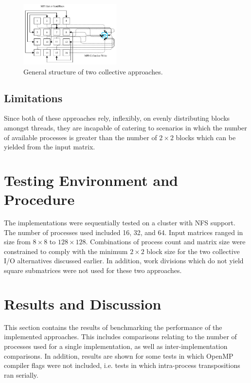 \documentclass[journal,10pt,a4paper]{IEEEtran}
\begin{document}
\begin{figure}[H]
    \centering
    \includegraphics[width=0.45\textwidth]{col.pdf}
    \caption{General structure of two collective approaches.}
    \label{fig:my_label}
\end{figure}



\subsection{Limitations}
Since both of these approaches rely, inflexibly, on evenly distributing blocks amongst threads, they are incapable of catering to scenarios in which the number of available processes is greater than the number of $2\times 2$ blocks which can be yielded from the input matrix.








\section{Testing Environment and Procedure}

The implementations were sequentially tested on a cluster with NFS support. The number of processes used included 16, 32, and 64. Input matrices ranged in size from $8\times 8$ to $128\times 128$. Combinations of process count and matrix size were constrained to comply with the minimum $2\times 2$ block size for the two collective I/O alternatives discussed earlier. In addition, work divisions which do not yield square submatrices were not used for these two approaches.


\section{Results and Discussion}

This section contains the results of benchmarking the performance of the implemented approaches. This includes comparisons relating to the number of processes used for a single implementation, as well as inter-implementation comparisons. In addition, results are shown for some tests in which OpenMP compiler flags were not included, i.e. tests in which intra-process transpositions ran serially.
\end{document}
